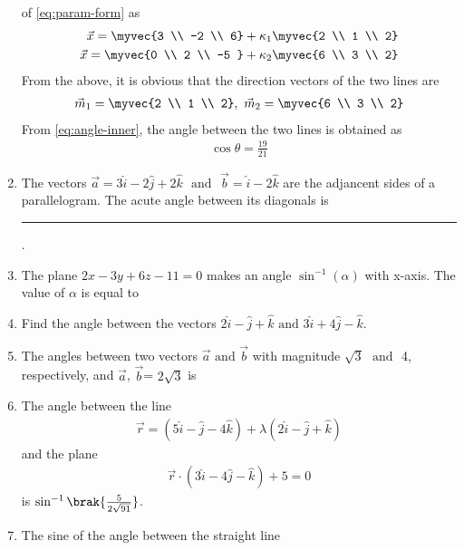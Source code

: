 \begin{enumerate}[label=\thesubsection.\arabic*, ref=\thesubsection.\theenumi]
of 
	\eqref{eq:param-form}
	as
\begin{align}
	\vec{x} = \myvec{3 \\ -2 \\ 6} + \kappa_1 \myvec{2 \\ 1 \\ 2}
	\\
	\vec{x} = \myvec{0 \\ 2 \\ -5 } + \kappa_2 \myvec{6 \\ 3 \\ 2}
\end{align}
From the above,  it is obvious that the direction vectors of the two lines are
\begin{align}
\vec{m}_1 =\myvec{2 \\ 1 \\ 2}, \
	\vec{m}_2=\myvec{6 \\ 3 \\ 2}
\end{align}
	From \eqref{eq:angle-inner},  the angle between the two lines is  obtained as
\begin{align}
	\cos \theta = \frac{19}{21}
\end{align}
\item The vectors $\vec{a}=3\hat{i}-2\hat{j}+2\hat{k}$ $\text{ and }$ $\vec{b}=\hat{i}-2\hat{k}$ are the adjancent sides of a parallelogram. The acute angle between its diagonals is \rule{1cm}{0.15mm}.
\item The plane $2x-3y+6z-11=0$ makes an angle $\sin^{-1}(\alpha)$ with x-axis. The value of $\alpha$ is equal to 
\item Find the angle between the vectors $2\hat{i}-\hat{j}+\hat{k}$ $\text{and}$ $3\hat{i}+4\hat{j}-\hat{k}$.
\item The angles between two vectors $\vec{a}$ $\text{and}$ $\vec{b}$ with magnitude $\sqrt{3}$ $\text{ and }$ 4,  respectively,  and $\vec{a}$,  $\vec{b}$= $2\sqrt{3}$ is
\item The angle between the line 
\begin{align}
	\overrightarrow{r}=(5\hat{i}-\hat{j}-4\hat{k})+\lambda(2\hat{i}-\hat{j}+\hat{k})
\end{align}
	and the plane 
\begin{align}
	\overrightarrow{r} \cdot (3\hat{i}-4\hat{j}-\hat{k})+5=0
\end{align}
	is $\sin^{-1}\brak{\frac{5}{2\sqrt{91}}}$.
\item The sine of the angle between the straight line 
\begin{align}

\end{align}
\end{enumerate}
